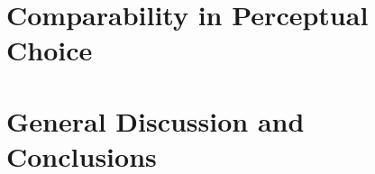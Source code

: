 \documentclass[dissertation]{umassthesis}          %
\begin{document}
\chapter{Comparability in Perceptual Choice}
\label{chapter_5}


\chapter{General Discussion and Conclusions}
\label{general_discussion_conclusion}



\appendix



\backmatter  %


\printbibliography
\end{document}
